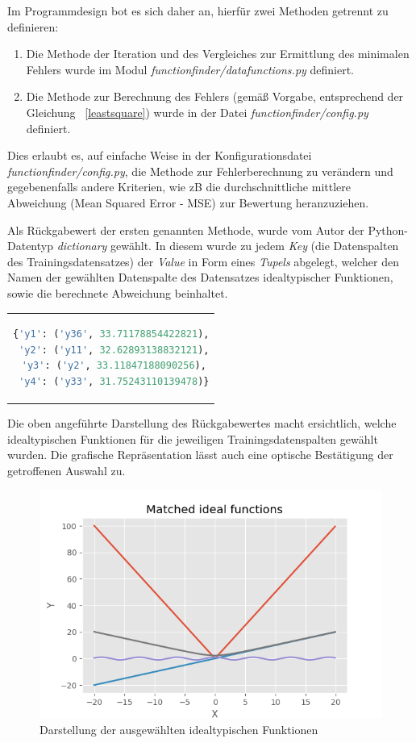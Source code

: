 Im Programmdesign bot es sich daher an, hierfür zwei Methoden getrennt zu definieren:
\begin{enumerate}
 \itemsep0pt
 \item Die Methode der Iteration und des Vergleiches zur Ermittlung des minimalen Fehlers wurde im Modul \emph{functionfinder/datafunctions.py} definiert.
 \item Die Methode zur Berechnung des Fehlers (gemäß Vorgabe, entsprechend der Gleichung ~\ref{leastsquare}) wurde in der Datei \emph{functionfinder/config.py} definiert.
\end{enumerate}

Dies erlaubt es, auf einfache Weise in der Konfigurationsdatei \emph{functionfinder/config.py}, die Methode zur Fehlerberechnung zu verändern und gegebenenfalls andere Kriterien, wie zB die durchschnittliche mittlere Abweichung (Mean Squared Error - MSE) zur Bewertung heranzuziehen. 

Als Rückgabewert der ersten genannten Methode, wurde vom Autor der Python-Datentyp \emph{dictionary} gewählt. In diesem wurde zu jedem \emph{Key} (die Datenspalten des Trainingsdatensatzes) der \emph{Value} in Form eines \emph{Tupels} abgelegt, welcher den Namen der gewählten Datenspalte des Datensatzes idealtypischer Funktionen, sowie die berechnete Abweichung beinhaltet.

\begin{tabular}{c}  %
\begin{lstlisting}[language=python,
				   caption={Darstellung des Rückgabewertes der berechneten Übereinstimmungen},
				   label=dictresult]
{'y1': ('y36', 33.71178854422821),
 'y2': ('y11', 32.62893138832121),
 'y3': ('y2', 33.11847188090256),
 'y4': ('y33', 31.75243110139478)}
\end{lstlisting}
\end{tabular}

Die oben angeführte Darstellung des Rückgabewertes macht ersichtlich, welche idealtypischen Funktionen für die jeweiligen Trainingsdatenspalten gewählt wurden. Die grafische Repräsentation lässt auch eine optische Bestätigung der getroffenen Auswahl zu.

\begin{figure}[h]
\centering
\includegraphics[width=12cm]{../output/figures/ideal.png}
\caption{Darstellung der ausgewählten idealtypischen Funktionen \cite{Gage:18}}
\label{fig:ideal}
\end{figure}


